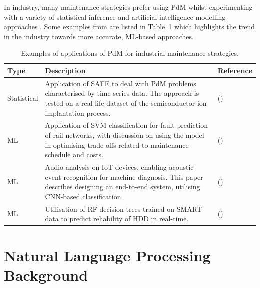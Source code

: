 \documentclass[10pt,oneside]{report}
\begin{document}
In industry, many maintenance strategies prefer using PdM whilst experimenting with a variety of statistical inference and artificial intelligence modelling approaches \cite{mobley2002introduction, jezzini2013effects}. Some examples from \cite{carvalho2019systematic} are listed in Table~\ref{tab:pdmPaperTable} which highlights the trend in the industry towards more accurate, ML-based approaches.

\begin{table}[htbp]
    \fontsize{8}{12}\selectfont
    \centering
    \caption{Examples of applications of PdM for industrial maintenance strategies.}
    \label{tab:pdmPaperTable}
    \begin{adjustbox}{max width=\textwidth}
    \begin{tabular}{p{1.5cm} p{8.5cm} p{3cm}}
        \toprule
        \textbf{Type} & \textbf{Description} & \textbf{Reference} \\
        \midrule
        Statistical & Application of SAFE to deal with PdM problems characterised by time-series data. The approach is tested on a real-life dataset of the semiconductor ion implantation process. & (\citet{susto2016dealing})\\
        ML & Application of SVM classification for fault prediction of rail networks, with discussion on using the model in optimising trade-offs related to maintenance schedule and costs. & (\citet{li2014improving})\\
        ML & Audio analysis on IoT devices, enabling acoustic event recognition for machine diagnosis. This paper describes designing an end-to-end system, utilising CNN-based classification. & (\citet{pan2017cognitive})  \\
        ML & Utilisation of RF decision trees trained on SMART data to predict reliability of HDD in real-time. & (\citet{su2018real}) \\
        \bottomrule
    \end{tabular}
    \end{adjustbox}
\end{table}



\chapter{Natural Language Processing Background}
\end{document}
